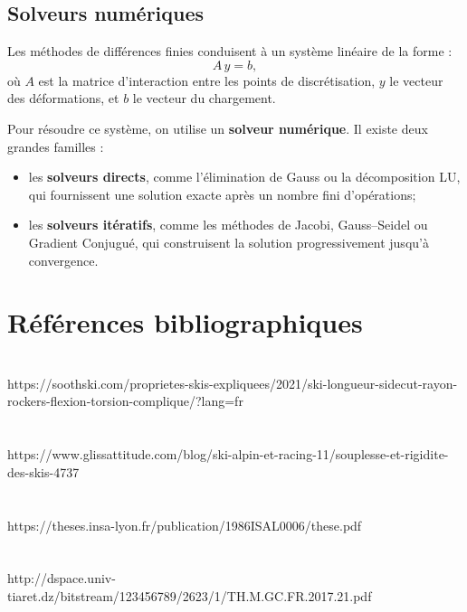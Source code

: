 \documentclass[12pt, a4paper]{article}
\begin{document}
\subsection{Solveurs numériques}

Les méthodes de différences finies conduisent à un système linéaire de la forme :
\[
A \, y = b,
\]
où $A$ est la matrice d'interaction entre les points de discrétisation, $y$ le vecteur des déformations, et $b$ le vecteur du chargement.

Pour résoudre ce système, on utilise un \textbf{solveur numérique}. Il existe deux grandes familles :
\begin{itemize}
\item les \textbf{solveurs directs}, comme l’élimination de Gauss ou la décomposition LU, qui fournissent une solution exacte après un nombre fini d’opérations;
  \item les \textbf{solveurs itératifs}, comme les méthodes de Jacobi, Gauss–Seidel ou Gradient Conjugué, qui construisent la solution progressivement jusqu’à convergence.
\end{itemize}

\section{\textbf{Références bibliographiques}}
\noindent
\\
https://soothski.com/proprietes-skis-expliquees/2021/ski-longueur-sidecut-rayon-rockers-flexion-torsion-complique/?lang=fr \\\\\\
https://www.glissattitude.com/blog/ski-alpin-et-racing-11/souplesse-et-rigidite-des-skis-4737 \\\\\\
https://theses.insa-lyon.fr/publication/1986ISAL0006/these.pdf\\\\\\
http://dspace.univ-tiaret.dz/bitstream/123456789/2623/1/TH.M.GC.FR.2017.21.pdf
\end{document}

